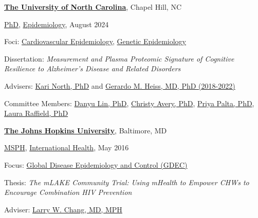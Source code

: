 \documentclass[10pt]{article}
\newcommand{\halfblankline}{\quad\vspace{-0.5\baselineskip}\pagebreak[3]}
\begin{document}
\href{https://sph.unc.edu/}{\textbf{The University of North Carolina}},
Chapel Hill, NC
\begin{outerlist}

\item[] \href{https://sph.unc.edu/programs/?ppk=epid-phd-r}{PhD},
        \href{http://www.jhsph.edu/departments/international-health/}
             {Epidemiology}, August 2024
        \begin{innerlist}
        \item Foci: \href{https://sph.unc.edu/epid/epidemiology-research/cardiovascular-epidemiology-research/}
          {Cardiovascular Epidemiology}, 
	\href{https://sph.unc.edu/epid/epidemiology-research/genetic-epidemiology-research/}{Genetic Epidemiology}
        \item Dissertation: 
        \emph{Measurement and Plasma Proteomic Signature of
        Cognitive Resilience to Alzheimer’s Disease and Related Disorders}
        \item Advisers:
        \href{https://sph.unc.edu/adv_profile/kari-north-phd/}
        {Kari North, PhD}
        and \href{https://sph.unc.edu/adv_profile/gerardo-heiss-phd/}
        {Gerardo M. Heiss, MD, PhD (2018-2022)}
        \item Committee Members:
        \href{https://dlin.web.unc.edu/}
        {Danyu Lin, PhD},
        \href{https://sph.unc.edu/adv_profile/christy-avery-phd/}
        {Christy Avery, PhD},
        \href{https://www.med.unc.edu/neurology/directory/priya-palta-md-phd/}
        {Priya Palta, PhD},
        \href{https://www.med.unc.edu/genetics/directory/laura-raffield-phd/}
        {Laura Raffield, PhD}
        \end{innerlist}
\end{outerlist}

\halfblankline

\href{http://www.jhsph.edu/}{\textbf{The Johns Hopkins University}},
Baltimore, MD
\begin{outerlist}

\item[] \href{http://www.jhsph.edu/academics/degree-programs/masters-programs/master-of-science-in-public-health/}{MSPH},
        \href{http://www.jhsph.edu/departments/international-health/}
             {International Health}, May 2016
        \begin{innerlist}
        \item Focus: \href{http://www.jhsph.edu/departments/international-health/program-areas/global-disease-epidemiology-control/index.html}
          {Global Disease Epidemiology and Control (GDEC)}
        \item Thesis: \emph{The mLAKE Community Trial: Using mHealth to
        Empower CHWs to Encourage Combination HIV Prevention}
        \item Adviser:
              \href{http://www.hopkinsmedicine.org/profiles/results/directory/profile/0021498/larry-chang}
                   {Larry W. Chang, MD, MPH}
        \end{innerlist}
\end{outerlist}
\end{document}
